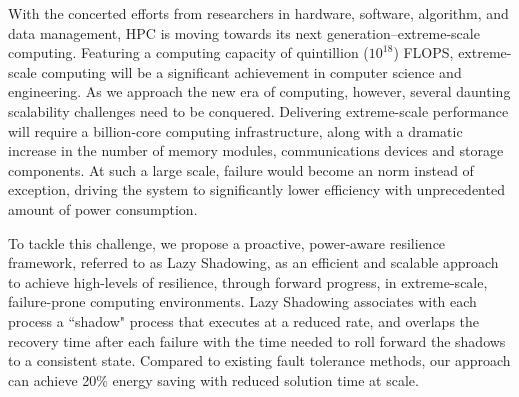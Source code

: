 With the concerted efforts from researchers in hardware, software, algorithm, and data management, HPC is moving towards its next generation--extreme-scale computing. Featuring a computing capacity of  quintillion ($10^{18}$) FLOPS, extreme-scale computing will be a significant achievement in computer science and engineering. %
As we approach the new era of computing, however, several daunting scalability challenges need to be conquered. Delivering extreme-scale performance will require a billion-core computing infrastructure, along with a dramatic increase in the number of memory modules, communications devices and storage components. At such a large scale, failure would become an norm instead of exception, driving the system to significantly lower efficiency with unprecedented amount of power consumption. %

To tackle this challenge, we propose a proactive, power-aware resilience framework, referred to as Lazy Shadowing, as an efficient and scalable approach to achieve high-levels of resilience, through forward progress, in extreme-scale, failure-prone computing environments. 
Lazy Shadowing associates with each process a ``shadow" process that executes at a reduced rate, and overlaps the recovery time after each failure with the time needed to roll forward the shadows to a consistent state.
Compared to existing fault tolerance methods, our approach can achieve 20\% energy saving with reduced solution time at scale.
